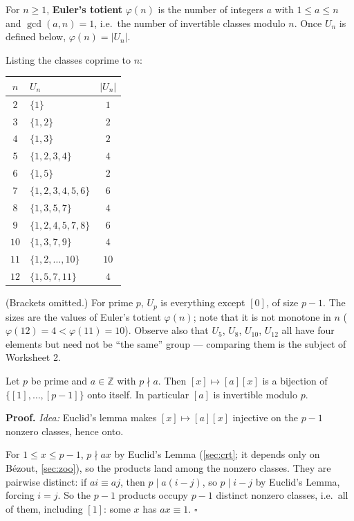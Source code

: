\documentclass[11pt]{report}
\renewenvironment{proof}[1][Proof]{\noindent\textbf{#1.} }{\hfill$\square$\par\vspace{5pt}}
\begin{document}
\begin{defbox}\label{def:eulers-totient-function}
For $n \geq 1$, \textbf{Euler's totient} $\varphi(n)$ is the number of integers $a$ with $1 \leq a \leq n$ and $\gcd(a, n) = 1$, i.e.\ the number of invertible classes modulo $n$. Once $U_n$ is defined below, $\varphi(n) = |U_n|$.
\end{defbox}

\begin{exbox}\label{ex:unit-groups-small-n}
Listing the classes coprime to $n$:
\begin{center}
\begin{tabular}{c|l|c}
$n$ & $U_n$ & $|U_n|$ \\ \hline
$2$ & $\{1\}$ & $1$ \\
$3$ & $\{1, 2\}$ & $2$ \\
$4$ & $\{1, 3\}$ & $2$ \\
$5$ & $\{1, 2, 3, 4\}$ & $4$ \\
$6$ & $\{1, 5\}$ & $2$ \\
$7$ & $\{1, 2, 3, 4, 5, 6\}$ & $6$ \\
$8$ & $\{1, 3, 5, 7\}$ & $4$ \\
$9$ & $\{1, 2, 4, 5, 7, 8\}$ & $6$ \\
$10$ & $\{1, 3, 7, 9\}$ & $4$ \\
$11$ & $\{1, 2, \ldots, 10\}$ & $10$ \\
$12$ & $\{1, 5, 7, 11\}$ & $4$
\end{tabular}
\end{center}
(Brackets omitted.) For prime $p$, $U_p$ is everything except $[0]$, of size $p - 1$. The sizes are the values of Euler's totient $\varphi(n)$; note that it is not monotone in $n$ ($\varphi(12) = 4 < \varphi(11) = 10$). Observe also that $U_5$, $U_8$, $U_{10}$, $U_{12}$ all have four elements but need not be ``the same'' group --- comparing them is the subject of Worksheet 2.
\end{exbox}

\begin{propbox}\label{prop:multiplication-nonzero-class-permutes-nonzero}
Let $p$ be prime and $a \in \mathbb{Z}$ with $p \nmid a$. Then $[x] \mapsto [a][x]$ is a bijection of $\{[1], \ldots, [p-1]\}$ onto itself. In particular $[a]$ is invertible modulo $p$.
\end{propbox}

\begin{proof}
\textit{Idea:} Euclid's lemma makes $[x] \mapsto [a][x]$ injective on the $p - 1$ nonzero classes, hence onto.\par
For $1 \leq x \leq p-1$, $p \nmid ax$ by Euclid's Lemma (\ref{sec:crt}; it depends only on B\'ezout, \ref{sec:zoo}), so the products land among the nonzero classes. They are pairwise distinct: if $ai \equiv aj$, then $p \mid a(i-j)$, so $p \mid i - j$ by Euclid's Lemma, forcing $i = j$. So the $p - 1$ products occupy $p - 1$ distinct nonzero classes, i.e.\ all of them, including $[1]$: some $x$ has $ax \equiv 1$.
\end{proof}
\end{document}

